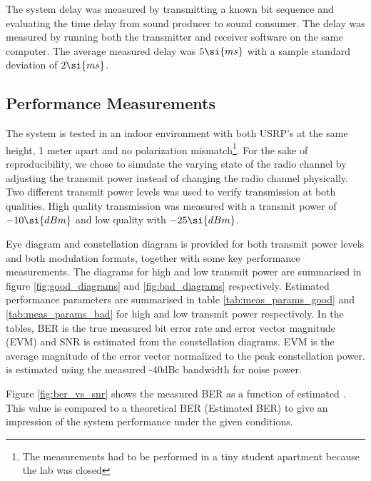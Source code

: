The system delay was measured by transmitting a known bit sequence and evaluating the time delay from sound producer to sound consumer. The delay was measured by running both the transmitter and receiver software on the same computer. The average measured delay was $\measDelay \si{ms}$ with a sample standard deviation of $\measDelayStd \si{ms}$.  

\subsection{Performance Measurements}
\label{sec:perf_meas}
The system is tested in an indoor environment with both USRP's at the same height, 1 meter apart and no polarization mismatch\footnote{The measurements had to be performed in a tiny student apartment because the lab was closed}. For the sake of reproducibility, we chose to simulate the varying state of the radio channel by adjusting the transmit power instead of changing the radio channel physically. Two different transmit power levels was used to verify transmission at both qualities. High quality transmission was measured with a transmit power of $\measPWR \si{dBm}$ and low quality with $\measPWRbad \si{dBm}$. 

Eye diagram and constellation diagram is provided for both transmit power levels and both modulation formats, together with some key performance measurements. The diagrams for high and low transmit power are summarised in figure \ref{fig:good_diagrams} and \ref{fig:bad_diagrams} respectively. Estimated performance parameters are summarised in table \ref{tab:meas_params_good} and \ref{tab:meas_params_bad} for high and low transmit power respectively. In the tables, BER is the true measured bit error rate and error vector magnitude (EVM) and SNR is estimated from the constellation diagrams. EVM is the average magnitude of the error vector normalized to the peak constellation power. \ebnot is estimated using the measured -40dBc bandwidth for noise power.






Figure \ref{fig:ber_vs_snr} shows the measured BER as a function of estimated \ebnot. This value is compared to a theoretical BER (Estimated BER) to give an impression of the system performance under the given conditions.




